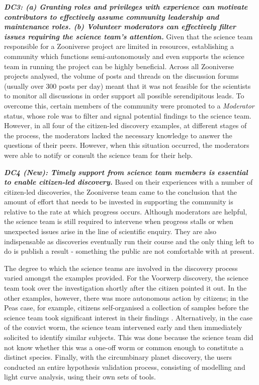 \documentclass{sigchi}
\begin{document}
\begin{spacing}{0.97}
\textbf{\emph{DC3: (a) Granting roles and privileges with experience can motivate contributors to effectively assume community leadership and maintenance roles. (b) Volunteer moderators can effectively filter issues requiring the science team's attention.}} Given that the science team responsible for a Zooniverse project are limited in resources, establishing a community which functions semi-autonomously and even supports the science team in running the project can be highly beneficial. Across all Zooniverse projects analysed, the volume of posts and threads on the discussion forums (usually over 300 posts per day) meant that it was not feasible for the scientists to monitor all discussions in order support all possible serendipitous leads. To overcome this, certain members of the community were promoted to a \emph{Moderator} status, whose role was to filter and signal potential findings to the science team. However, in all four of the citizen-led discovery examples, at different stages of the process, the moderators lacked the necessary knowledge to answer the questions of their peers. However, when this situation occurred, the moderators were able to notify or consult the science team for their help.

\textbf{\emph{DC4 (New): Timely support from science team members is essential to enable citizen-led discovery.}} Based on their experiences with a number of citizen-led discoveries, the Zooniverse team came to the conclusion that the amount of effort that needs to be invested in supporting the community is relative to the rate at which progress occurs. Although moderators are helpful, the science team is still required to intervene when progress stalls or when unexpected issues arise in the line of scientific enquiry. They are also indispensable as discoveries eventually run their course and the only thing left to do is publish a result - something the public are not comfortable with at present.

The degree to which the science teams are involved in the discovery process varied amongst the examples provided. For the Voorwerp discovery, the science team took over the investigation shortly after the citizen pointed it out. In the other examples, however, there was more autonomous action by citizens; in the Peas case, for example, citizens self-organised a collection of samples before the science team took significant interest in their findings \cite{story-of-the-peas}. Alternatively, in the case of the convict worm, the science team intervened early and then immediately solicited to identify similar subjects. This was done because the science team did not know whether this was a one-off worm or common enough to constitute a distinct species. Finally, with the circumbinary planet discovery, the users conducted an entire hypothesis validation process, consisting of modelling and light curve analysis, using their own sets of tools. 


\end{spacing}
\end{document}
